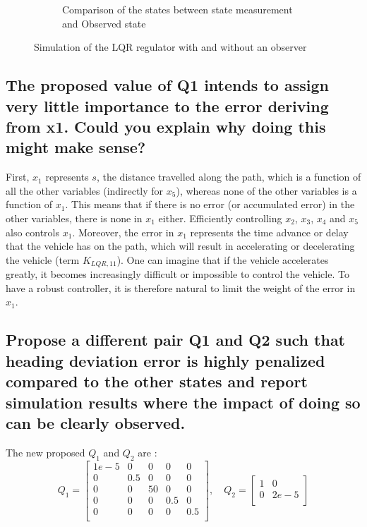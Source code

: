 \begin{figure}[H]
\begin{subfigure}[b]{0.95\textwidth}
         \caption{Comparison of the states between state measurement and Observed state}
         \label{fig:Obs}
     \end{subfigure}
    \caption{Simulation of the LQR regulator with and without an observer}
    \label{fig:sim}
\end{figure}

\subsection{The proposed value of Q1 intends to assign very little importance to the error deriving from x1. Could you explain why doing this might make sense?}

First, $x_1$ represents $s$, the distance travelled along the path, which is a function of all the other variables (indirectly for $x_5$), whereas none of the other variables is a function of $x_1$. This means that if there is no error (or accumulated error) in the other variables, there is none in $x_1$ either. Efficiently controlling $x_2$, $x_3$, $x_4$ and $x_5$ also controls $x_1$. Moreover, the error in $x_1$ represents the time advance or delay that the vehicle has on the path, which will result in accelerating or decelerating the vehicle (term $K_{LQR,11}$). One can imagine that if the vehicle accelerates greatly, it becomes increasingly difficult or impossible to control the vehicle. To have a robust controller, it is therefore natural to limit the weight of the error in $x_1$.



\subsection{Propose a different pair Q1 and Q2 such that heading deviation error is highly penalized compared to the other states and report simulation results where the impact of doing so can be clearly observed.}
The new proposed $Q_1$ and $Q_2$ are :
\begin{equation}
    Q_1 = 
    \left[ {\begin{array}{ccccc}
        1e-5 &0   &0   &0   &0     \\
        0    &0.5 &0   &0   &0     \\
        0    &0   &50  &0   &0     \\
        0    &0   &0   &0.5 &0     \\
        0    &0   &0   &0   &0.5   \\
    \end{array} } \right]    
    ,\quad
    Q_2 =
    \left[ {\begin{array}{cc}
        1 &0\\
        0 &2e-5\\
    \end{array} } \right]
\end{equation}

